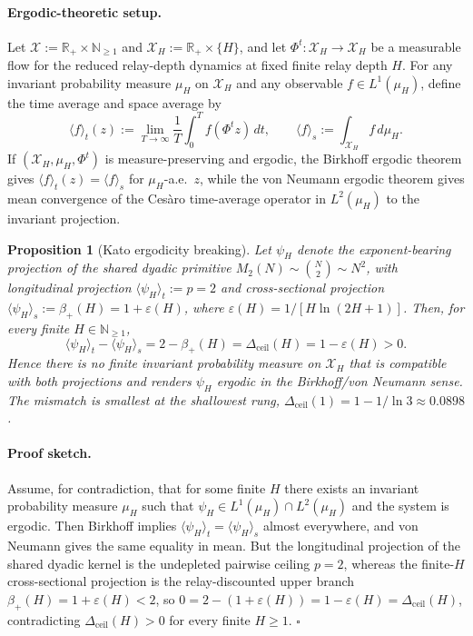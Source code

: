 \documentclass[11pt]{article}
\newtheorem{proposition}{Proposition}
\begin{document}
\paragraph{Ergodic-theoretic setup.}
Let $\mathcal X:=\mathbb R_{+}\times\mathbb N_{\ge 1}$ and $\mathcal X_H:=\mathbb R_{+}\times\{H\}$, and let $\Phi^{t}:\mathcal X_H\to\mathcal X_H$ be a measurable flow for the reduced relay-depth dynamics at fixed finite relay depth $H$.  For any invariant probability measure $\mu_H$ on $\mathcal X_H$ and any observable $f\in L^{1}(\mu_H)$, define the time average and space average by
\[
\langle f\rangle_t(z):=\lim_{T\to\infty}\frac{1}{T}\int_{0}^{T} f(\Phi^{t}z)\,dt,\qquad
\langle f\rangle_s:=\int_{\mathcal X_H} f\,d\mu_H .
\]
If $(\mathcal X_H,\mu_H,\Phi^t)$ is measure-preserving and ergodic, the Birkhoff ergodic theorem gives $\langle f\rangle_t(z)=\langle f\rangle_s$ for $\mu_H$-a.e.\ $z$, while the von Neumann ergodic theorem gives mean convergence of the Cesàro time-average operator in $L^2(\mu_H)$ to the invariant projection.

\begin{proposition}[Kato ergodicity breaking]
\label{prop:S10_13_kato_ergodicity_breaking}
Let $\psi_H$ denote the exponent-bearing projection of the shared dyadic primitive $M_2(N)\sim\binom{N}{2}\sim N^2$, with longitudinal projection $\langle\psi_H\rangle_t:=p=2$ and cross-sectional projection $\langle\psi_H\rangle_s:=\beta_+(H)=1+\varepsilon(H)$, where $\varepsilon(H)=1/[H\ln(2H+1)]$.  Then, for every finite $H\in\mathbb N_{\ge 1}$,
\[
\langle\psi_H\rangle_t-\langle\psi_H\rangle_s=2-\beta_+(H)=\Delta_{\mathrm{ceil}}(H)=1-\varepsilon(H)>0.
\]
Hence there is no finite invariant probability measure on $\mathcal X_H$ that is compatible with both projections and renders $\psi_H$ ergodic in the Birkhoff/von Neumann sense.  The mismatch is smallest at the shallowest rung, $\Delta_{\mathrm{ceil}}(1)=1-1/\ln 3\approx 0.0898$.
\end{proposition}

\paragraph{Proof sketch.}
Assume, for contradiction, that for some finite $H$ there exists an invariant probability measure $\mu_H$ such that $\psi_H\in L^1(\mu_H)\cap L^2(\mu_H)$ and the system is ergodic.  Then Birkhoff implies $\langle\psi_H\rangle_t=\langle\psi_H\rangle_s$ almost everywhere, and von Neumann gives the same equality in mean.  But the longitudinal projection of the shared dyadic kernel is the undepleted pairwise ceiling $p=2$, whereas the finite-$H$ cross-sectional projection is the relay-discounted upper branch $\beta_+(H)=1+\varepsilon(H)<2$, so $0=2-(1+\varepsilon(H))=1-\varepsilon(H)=\Delta_{\mathrm{ceil}}(H)$, contradicting $\Delta_{\mathrm{ceil}}(H)>0$ for every finite $H\ge 1$. $\square$
\end{document}
